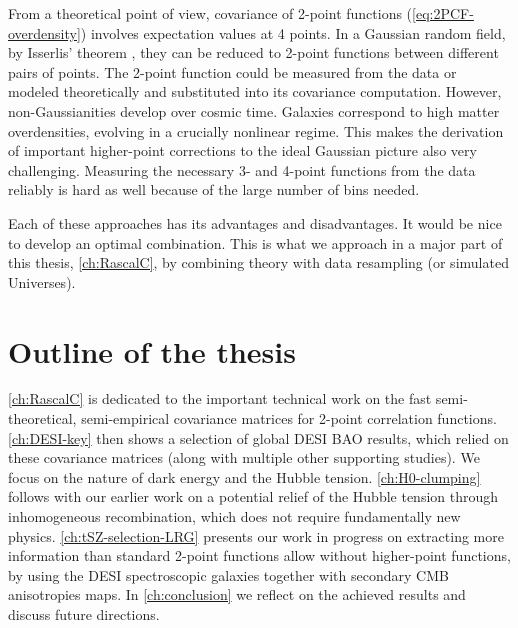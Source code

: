 From a theoretical point of view, covariance of 2-point functions (\eqref{eq:2PCF-overdensity}) involves expectation values at 4 points.
In a Gaussian random field, by Isserlis' theorem \citep{isserlis}, they can be reduced to 2-point functions between different pairs of points.
The 2-point function could be measured from the data or modeled theoretically and substituted into its covariance computation.
However, non-Gaussianities develop over cosmic time.
Galaxies correspond to high matter overdensities, evolving in a crucially nonlinear regime.
This makes the derivation of important higher-point corrections to the ideal Gaussian picture also very challenging.
Measuring the necessary 3- and 4-point functions from the data reliably is hard as well because of the large number of bins needed.

Each of these approaches has its advantages and disadvantages.
It would be nice to develop an optimal combination.
This is what we approach in a major part of this thesis, \cref{ch:RascalC}, by combining theory with data resampling (or simulated Universes).

\section{Outline of the thesis}

\cref{ch:RascalC} is dedicated to the important technical work on the fast semi-theoretical, semi-empirical covariance matrices for 2-point correlation functions.
\cref{ch:DESI-key} then shows a selection of global DESI BAO results, which relied on these covariance matrices (along with multiple other supporting studies).
We focus on the nature of dark energy and the Hubble tension.
\cref{ch:H0-clumping} follows with our earlier work on a potential relief of the Hubble tension through inhomogeneous recombination, which does not require fundamentally new physics.
\cref{ch:tSZ-selection-LRG} presents our work in progress on extracting more information than standard 2-point functions allow without higher-point functions, by using the DESI spectroscopic galaxies together with secondary CMB anisotropies maps.
In \cref{ch:conclusion} we reflect on the achieved results and discuss future directions.